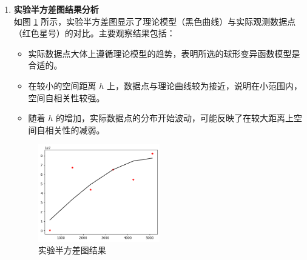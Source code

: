 \documentclass[12pt,a4paper]{nmmcm}
\begin{document}
\begin{enumerate}
  \item \textbf{实验半方差图结果分析} \\
        如图 \ref{fig:KrigingSemivariogram} 所示，实验半方差图显示了理论模型（黑色曲线）与实际观测数据点（红色星号）的对比。主要观察结果包括：
        \begin{itemize}
          \item 实际数据点大体上遵循理论模型的趋势，表明所选的球形变异函数模型是合适的。
          \item 在较小的空间距离 \( h \) 上，数据点与理论曲线较为接近，说明在小范围内，空间自相关性较强。
          \item 随着 \( h \) 的增加，实际数据点的分布开始波动，可能反映了在较大距离上空间自相关性的减弱。
        \end{itemize}

        \begin{figure}[h]
          \centering
          \includegraphics[width=0.5\textwidth]{figures/task4/task4-1.png}
          \caption{实验半方差图结果}
          \label{fig:KrigingSemivariogram}
        \end{figure}



\end{enumerate}
\end{document}
